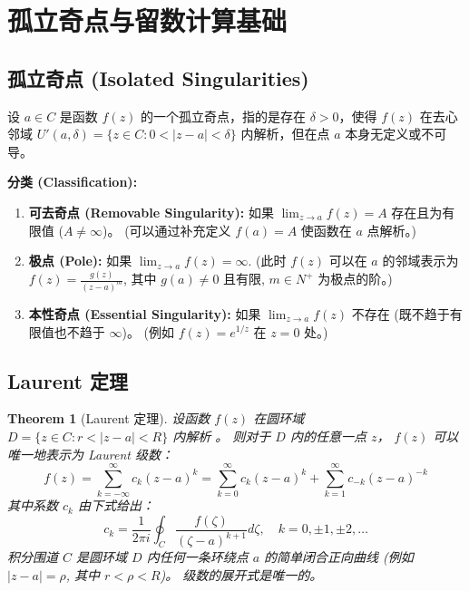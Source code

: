 \documentclass[linespread=1.5,openany]{book}%
\def\C{C}%
\def\N{N}%
\def\diff{d}%
\theoremstyle{plain}
\newtheorem{theorem}{Theorem}
\newcommand{\diff}{\mathop{}\!\mathrm{d}}  %
\newcommand{\C}{\mathbb{C}}                %
\newcommand{\N}{\mathbb{N}}                %
\begin{document}
{{{{{{{									
									
									\section{孤立奇点与留数计算基础 }
									{ %
										\subsection{孤立奇点 (Isolated Singularities)}
										{ %
											设 $a \in \C$ 是函数 $f(z)$ 的一个孤立奇点，指的是存在 $\delta > 0$，使得 $f(z)$ 在去心邻域 $U'(a, \delta) = \{z \in \C : 0 < |z-a| < \delta\}$ 内解析，但在点 $a$ 本身无定义或不可导。
											
											\textbf{分类 (Classification):}
											\begin{enumerate}[label=\arabic*)]
												\item \textbf{可去奇点 (Removable Singularity):}
												如果 $\lim_{z\to a} f(z) = A$ 存在且为有限值 ($A \neq \infty$)。
												(可以通过补充定义 $f(a)=A$ 使函数在 $a$ 点解析。)
												\item \textbf{极点 (Pole):}
												如果 $\lim_{z\to a} f(z) = \infty$.
												(此时 $f(z)$ 可以在 $a$ 的邻域表示为 $f(z) = \frac{g(z)}{(z-a)^m}$, 其中 $g(a) \neq 0$ 且有限, $m \in \N^+$ 为极点的阶。)
												\item \textbf{本性奇点 (Essential Singularity):}
												如果 $\lim_{z\to a} f(z)$ 不存在 (既不趋于有限值也不趋于 $\infty$)。
												(例如 $f(z) = e^{1/z}$ 在 $z=0$ 处。)
											\end{enumerate}
										} %
									} %
									
									\subsection{Laurent 定理 }
									{ %
										\begin{theorem}[Laurent 定理] \label{thm:L16_laurent_series}
											设函数 $f(z)$ 在圆环域 $D = \{z \in \C : r < |z-a| < R\}$ 内解析 。
											则对于 $D$ 内的任意一点 $z$， $f(z)$ 可以唯一地表示为 Laurent 级数：
											\begin{equation}
												f(z) = \sum_{k=-\infty}^{\infty} c_k (z-a)^k = \sum_{k=0}^{\infty} c_k (z-a)^k + \sum_{k=1}^{\infty} c_{-k} (z-a)^{-k} 
											\end{equation}
											其中系数 $c_k$ 由下式给出：
											\begin{equation}
												c_k = \frac{1}{2\pi i} \oint_C \frac{f(\zeta)}{(\zeta-a)^{k+1}} \diff \zeta, \quad k = 0, \pm 1, \pm 2, \dots 
											\end{equation}
											积分围道 $C$ 是圆环域 $D$ 内任何一条环绕点 $a$ 的简单闭合正向曲线 (例如 $|z-a|=\rho$, 其中 $r < \rho < R$)。
											级数的展开式是唯一的。
										\end{theorem}
										
}}}}}}}}
\end{document}
